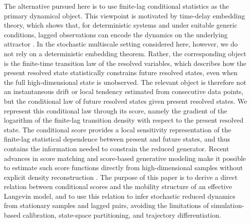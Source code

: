 \documentclass[11pt,twoside,fleqn]{article}
\begin{document}
The alternative pursued here is to use finite-lag conditional statistics as the primary dynamical object. This viewpoint is motivated by time-delay embedding theory, which shows that, for deterministic systems and under suitable generic
conditions, lagged observations can encode the dynamics on the underlying
attractor \cite{Takens1981,BotvinickGreenhouse2025}. In the stochastic
multiscale setting considered here, however, we do not rely on a deterministic
embedding theorem. Rather, the corresponding object is the finite-time
transition law of the resolved variables, which describes how the present
resolved state statistically constrains future resolved states, even when the
full high-dimensional state is unobserved. The relevant object is therefore not
an instantaneous drift or local tendency estimated from consecutive data points,
but the conditional law of future resolved states given present resolved states.
We represent this conditional law through its score, namely the gradient of the
logarithm of the finite-lag transition density with respect to the present
resolved state. The conditional score provides a local sensitivity
representation of the finite-lag statistical dependence between present and
future states, and thus contains the information needed to constrain the reduced
generator. Recent advances in score matching and score-based generative modeling
make it possible to estimate such score functions directly from high-dimensional
samples without explicit density reconstruction
\cite{Hyvarinen2005,Vincent2011,SongSohlDicksteinKingma2021,giorgini2025kgmm}.
The purpose of this paper is to derive a direct relation between conditional
scores and the mobility structure of an effective Langevin model, and to use
this relation to infer stochastic reduced dynamics from stationary samples and
lagged pairs, avoiding the limitations of simulation-based calibration,
state-space partitioning, and trajectory differentiation.
\end{document}
